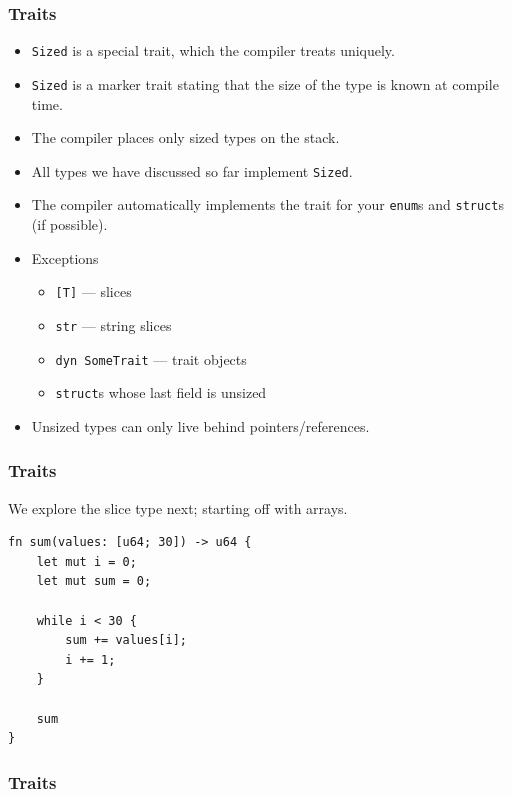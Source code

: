 \begin{frame}[fragile]
    \frametitle{Traits}
    \begin{itemize}
        \item \texttt{Sized} is a special trait, which the compiler treats uniquely.
        \item \texttt{Sized} is a marker trait stating that the size of the type is known at compile time.
        \item The compiler places only sized types on the stack.
        \pause
        \item All types we have discussed so far implement \texttt{Sized}.
        \item The compiler automatically implements the trait for your \texttt{enum}s and \texttt{struct}s (if possible).
        \pause
        \item Exceptions
        \begin{itemize}
            \item \texttt{[T]} --- slices
            \item \texttt{str} --- string slices
            \item \texttt{dyn SomeTrait} --- trait objects
            \item \texttt{struct}s whose last field is unsized
        \end{itemize}
        \pause
        \item Unsized types can only live behind pointers/references.
    \end{itemize}
\end{frame}

\begin{frame}[fragile]
    \frametitle{Traits}
    We explore the slice type next; starting off with arrays.
    \vfill
    \begin{verbatim}
fn sum(values: [u64; 30]) -> u64 {
    let mut i = 0;
    let mut sum = 0;

    while i < 30 {
        sum += values[i];
        i += 1;
    }

    sum
}
    \end{verbatim}
\end{frame}

\begin{frame}[fragile]
    \frametitle{Traits}
    \begin{center}
    \end{center}
\end{frame}

